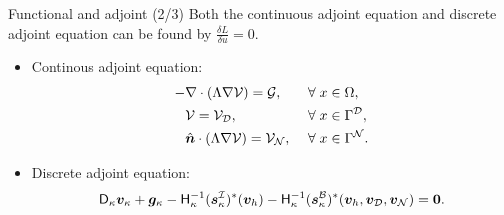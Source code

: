 \documentclass{beamer}
\begin{document}
\begin{frame}{Functional and adjoint (2/3)}
    Both the continuous adjoint equation and discrete adjoint equation can be found by $\frac{\delta L}{\delta u} = 0$.
    \begin{itemize}
        \item Continous adjoint equation:
        \begin{equation*}
        \begin{aligned}
        -&\nabla\cdot\left(\Lambda \nabla\mathcal{V} \right) = \mathcal{G},\quad &&\forall \; x \in \Omega, \\
        &\mathcal{V} = \mathcal{V}_{\mathcal{D}}, \quad &&\forall \; x \in \Gamma^{\mathcal{D}},  \\
        &\hat{\bm{n}} \cdot \left( \Lambda \nabla \mathcal{V}\right) = \mathcal{V}_{\mathcal{N}},
        &&\forall \; x \in \Gamma^{\mathcal{N}}.
        \end{aligned}
        \end{equation*}
        \item Discrete adjoint equation:
        \begin{equation*}\label{eq:adjoint_SBP}
        \mathsf{D}_{\kappa} \bm{v}_\kappa + \bm{g}_{\kappa}
        - \mathsf{H}_{\kappa}^{-1} (\bm{s}_{\kappa}^{\mathcal{I}})^{*}(\bm{v}_h)
        - \mathsf{H}_{\kappa}^{-1} (\bm{s}_{\kappa}^{\mathcal{B}})^{*}(\bm{v}_h,\bm{v}_{\mathcal{D}},\bm{v}_{\mathcal{N}})
        = \bm{0}.
        \end{equation*}
    \end{itemize}
\end{frame}
\end{document}
